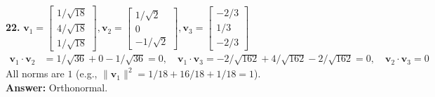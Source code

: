 \documentclass[11pt, letterpaper]{article}
\theoremstyle{definition}
\theoremstyle{remark}
\begin{document}
\textbf{22.} $\mathbf{v}_1 = \begin{bmatrix} 1/\sqrt{18} \\ 4/\sqrt{18} \\ 1/\sqrt{18} \end{bmatrix}, \mathbf{v}_2 = \begin{bmatrix} 1/\sqrt{2} \\ 0 \\ -1/\sqrt{2} \end{bmatrix}, \mathbf{v}_3 = \begin{bmatrix} -2/3 \\ 1/3 \\ -2/3 \end{bmatrix}$
\begin{align*}
    \mathbf{v}_1 \cdot \mathbf{v}_2 &= 1/\sqrt{36} + 0 - 1/\sqrt{36} = 0, \quad \mathbf{v}_1 \cdot \mathbf{v}_3 = -2/\sqrt{162} + 4/\sqrt{162} - 2/\sqrt{162} = 0, \quad \mathbf{v}_2 \cdot \mathbf{v}_3 = 0
\end{align*}
All norms are $1$ (e.g., $\|\mathbf{v}_1\|^2 = 1/18 + 16/18 + 1/18 = 1$). \\
\textbf{Answer:} Orthonormal.
\end{document}
